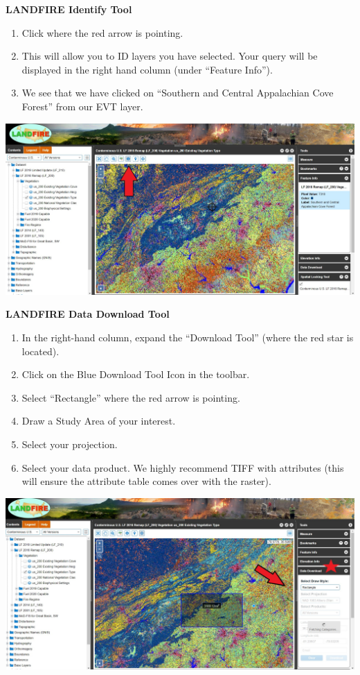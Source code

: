 \documentclass[
]{book}
\providecommand{\tightlist}{%
  \setlength{\itemsep}{0pt}\setlength{\parskip}{0pt}}
\begin{document}
\textbf{LANDFIRE Identify Tool}

\begin{enumerate}
\def\labelenumi{\arabic{enumi}.}
\tightlist
\item
  Click where the red arrow is pointing.
\item
  This will allow you to ID layers you have selected. Your query will be displayed in the right hand column (under ``Feature Info'').
\item
  We see that we have clicked on ``Southern and Central Appalachian Cove Forest'' from our EVT layer.
\end{enumerate}

\includegraphics[width=1000px]{KP_screenshots/LANDFIRE Identify}

\textbf{LANDFIRE Data Download Tool}

\begin{enumerate}
\def\labelenumi{\arabic{enumi}.}
\tightlist
\item
  In the right-hand column, expand the ``Download Tool'' (where the red star is located).
\item
  Click on the Blue Download Tool Icon in the toolbar.
\item
  Select ``Rectangle'' where the red arrow is pointing.
\item
  Draw a Study Area of your interest.
\item
  Select your projection.
\item
  Select your data product. We highly recommend TIFF with attributes (this will ensure the attribute table comes over with the raster).
\end{enumerate}

\includegraphics[width=1000px]{KP_screenshots/LANDFIRE Rectangle Data Download}
\end{document}
